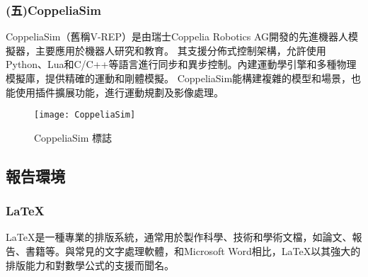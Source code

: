 \subsubsection{(五)CoppeliaSim}
CoppeliaSim（舊稱V-REP）是由瑞士Coppelia Robotics AG開發的先進機器人模擬器，主要應用於機器人研究和教育。
其支援分佈式控制架構，允許使用Python、Lua和C/C++等語言進行同步和異步控制。內建運動學引擎和多種物理模擬庫，提供精確的運動和剛體模擬。
CoppeliaSim能構建複雜的模型和場景，也能使用插件擴展功能，進行運動規劃及影像處理。\\

\begin{figure}[hbt!]
\center
\texttt{[image: CoppeliaSim]}
\caption{\Large CoppeliaSim 標誌}
\end{figure}



\subsection{報告環境}
\fontsize{14pt}{2.5pt}\sectionef\hspace{12pt}
\subsubsection{LaTeX}
\fontsize{14pt}{2.5pt}\sectionef\hspace{12pt}
LaTeX是一種專業的排版系統，通常用於製作科學、技術和學術文檔，如論文、報告、書籍等。與常見的文字處理軟體，和Microsoft Word相比，LaTeX以其強大的排版能力和對數學公式的支援而聞名。

\newpage

\renewcommand{\baselinestretch}{0.5} %